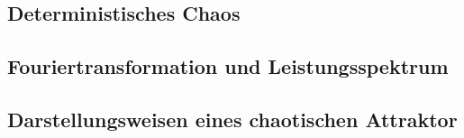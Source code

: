 \subsection{Deterministisches Chaos}
\label{sub:determChaos}

\subsection{Fouriertransformation und Leistungsspektrum}
\label{sub:fouriertrafo}

\subsection{Darstellungsweisen eines chaotischen Attraktor}
\label{sub:darstellungAttraktor}
